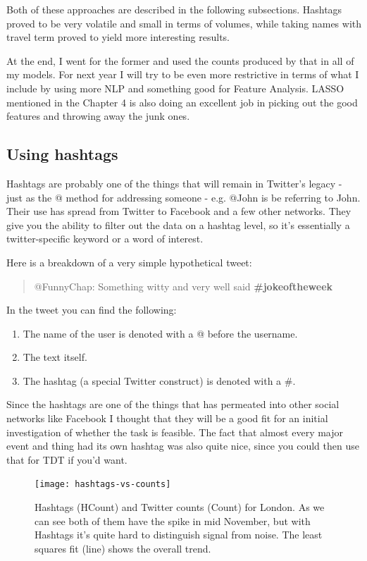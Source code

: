 \documentclass[minf,twoside,singlespacing,parskip,frontabs]{infthesis}
\begin{document}
Both of these approaches are described in the following subsections. Hashtags proved to be very volatile and small in terms of volumes, while taking names with travel term proved to yield more interesting results.  

At the end, I went for the former and used the counts produced by that in all of my models. For next year I will try to be even more restrictive in terms of what I include by using more NLP and something good for Feature Analysis. LASSO \cite{lasso} mentioned in the Chapter 4 is also doing an excellent job in picking out the good features and throwing away the junk ones. 

\subsection{Using hashtags}
\label{sec:hashtag}

Hashtags are probably one of the things that will remain in Twitter's legacy - just as the @ method for addressing someone - e.g. @John is be referring to John. Their use has spread from Twitter to Facebook and a few other networks. They give you the ability to filter out the data on a  hashtag level, so it's essentially a twitter-specific keyword or a word of interest. 


Here is a breakdown of a very simple hypothetical tweet:

\begin{quotation}
@FunnyChap: Something witty and very well said \bf{\#jokeoftheweek}
\end{quotation}

In the tweet you can find the following: 
\begin{enumerate}
\item The name of the user is denoted with a @ before the username.
\item The text itself.
\item The hashtag (a special Twitter construct) is denoted with a \#.
\end{enumerate}


Since the hashtags are one of the things that has permeated into other social networks like Facebook I thought that they will be a good fit for an initial investigation of whether the task is feasible. The fact that almost every major event and thing had its own hashtag was also quite nice, since you could then use that for TDT if you'd want.

\begin{figure}[]
\begin{center}
\texttt{[image: hashtags-vs-counts]}
\end{center}
\caption{Hashtags (HCount) and Twitter counts (Count) for London. As we can see both of them have the spike in mid November, but with Hashtags it's quite hard to distinguish signal from noise. The least squares fit (line) shows the overall trend.}
\label{hashtag-count}
\end{figure}
\end{document}
